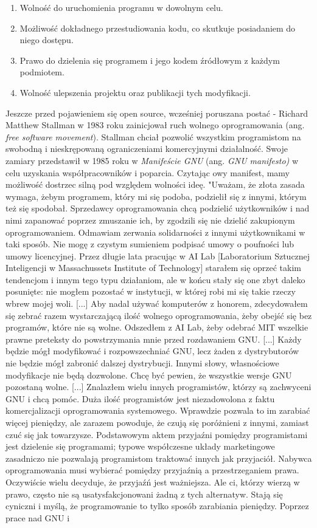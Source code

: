 \documentclass{article}
\begin{document}
\begin{enumerate}
    \item Wolność do uruchomienia programu w dowolnym celu.
    \item Możliwość dokładnego przestudiowania kodu, co skutkuje posiadaniem do niego dostępu.
    \item Prawo do dzielenia się programem i jego kodem źródłowym z każdym podmiotem.
    \item Wolność ulepszenia projektu oraz publikacji tych modyfikacji. 
\end{enumerate} 

Jeszcze przed pojawieniem się open source, wcześniej poruszana postać - Richard Matthew Stallman w 1983 roku zainicjował ruch wolnego oprogramowania (ang. \emph{free software movement}). Stallman chciał pozwolić wszystkim programistom na swobodną i nieskrępowaną ograniczeniami komercyjnymi działalność. Swoje zamiary przedstawił w 1985 roku w \emph{Manifeście GNU} (ang. \emph{GNU manifesto)} w celu uzyskania współpracowników i poparcia\cite{Kotula}. Czytając owy manifest, mamy możliwość dostrzec silną pod względem wolności ideę. "Uważam, że złota zasada wymaga, żebym programem, który mi się podoba, podzielił się z innymi, którym też się spodobał. Sprzedawcy oprogramowania chcą podzielić użytkowników i nad nimi zapanować poprzez zmuszanie ich, by zgodzili się nie dzielić zakupionym oprogramowaniem. Odmawiam zerwania solidarności z innymi użytkownikami w taki sposób. Nie mogę z czystym sumieniem podpisać umowy o poufności lub umowy licencyjnej. Przez długie lata pracując w AI Lab [Laboratorium Sztucznej Inteligencji w Massachussets Institute of Technology] starałem się oprzeć takim tendencjom i innym tego typu działaniom, ale w końcu stały się one zbyt daleko posunięte: nie mogłem pozostać w instytucji, w której robi mi się takie rzeczy wbrew mojej woli. [...] Aby nadal używać komputerów z honorem, zdecydowałem się zebrać razem wystarczającą ilość wolnego oprogramowania, żeby obejść się bez programów, które nie są wolne. Odszedłem z AI Lab, żeby odebrać MIT wszelkie prawne preteksty do powstrzymania mnie przed rozdawaniem GNU. [...] Każdy będzie mógł modyfikować i rozpowszechniać GNU, lecz żaden z dystrybutorów nie będzie mógł zabronić dalszej dystrybucji. Innymi słowy, własnościowe modyfikacje nie będą dozwolone. Chcę być pewien, że wszystkie wersje GNU pozostaną wolne. [...] Znalazłem wielu innych programistów, którzy są zachwyceni GNU i chcą pomóc. Duża ilość programistów jest niezadowolona z faktu komercjalizacji oprogramowania systemowego. Wprawdzie pozwala to im zarabiać więcej pieniędzy, ale zarazem powoduje, że czują się poróżnieni z innymi, zamiast czuć się jak towarzysze. Podstawowym aktem przyjaźni pomiędzy programistami jest dzielenie się programami; typowe współczesne układy marketingowe zasadniczo nie pozwalają programistom traktować innych jak przyjaciół. Nabywca oprogramowania musi wybierać pomiędzy przyjaźnią a przestrzeganiem prawa. Oczywiście wielu decyduje, że przyjaźń jest ważniejsza. Ale ci, którzy wierzą w prawo, często nie są usatysfakcjonowani żadną z tych alternatyw. Stają się cyniczni i myślą, że programowanie to tylko sposób zarabiania pieniędzy. Poprzez prace nad GNU i 
\end{document}
